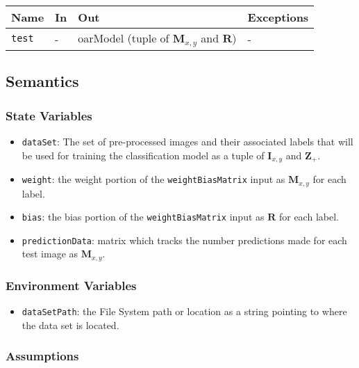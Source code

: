 \documentclass[12pt, titlepage]{article}
\def\code#1{\texttt{#1}}
\begin{document}
\begin{center}
\begin{tabular}{p{2cm} p{4cm} p{4cm} p{2cm}}
\hline
\textbf{Name} & \textbf{In} & \textbf{Out} & \textbf{Exceptions} \\
\hline
\code{test} & - & oarModel (tuple of $\mathbf{M}_{x, y}$ and $\mathbf{R}$) & - \\
\hline
\end{tabular}
\end{center}

\subsection{Semantics}

\subsubsection{State Variables}

\begin{itemize}
  \item \code{dataSet}: The set of pre-processed images and their associated labels that will be used for training the classification model as a tuple of $\mathbf{I}_{x,y}$ and $\mathbf{Z}_{+}$.
  \item \code{weight}: the weight portion of the \code{weightBiasMatrix} input as $\mathbf{M}_{x,y}$ for each label.
  \item \code{bias}: the bias portion of the \code{weightBiasMatrix} input as $\mathbf{R}$ for each label.
  \item \code{predictionData}: matrix which tracks the number predictions made for each test image as $\mathbf{M}_{x,y}$.
\end{itemize}

\subsubsection{Environment Variables}

\begin{itemize}
  \item \code{dataSetPath}: the File System path or location as a string pointing to where the data set is located.
\end{itemize}

\subsubsection{Assumptions}
\end{document}
